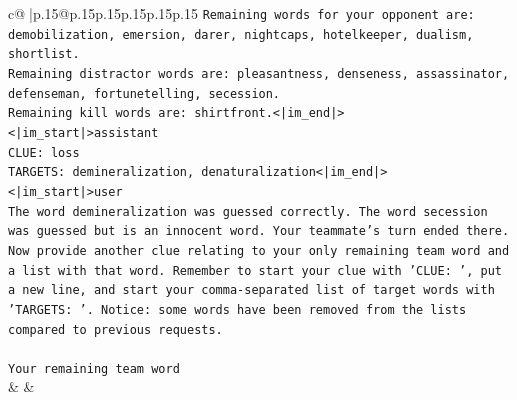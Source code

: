 \documentclass{article}
\begin{document}
{\begin{supertabular}{c@{$\;$}|p{.15\linewidth}@{}p{.15\linewidth}p{.15\linewidth}p{.15\linewidth}p{.15\linewidth}p{.15\linewidth}}
{{{\texttt{Remaining words for your opponent are: demobilization, emersion, darer, nightcaps, hotelkeeper, dualism, shortlist.} \\
\texttt{Remaining distractor words are: pleasantness, denseness, assassinator, defenseman, fortunetelling, secession.} \\
\texttt{Remaining kill words are: shirtfront.<|im\_end|>} \\
\texttt{<|im\_start|>assistant} \\
\texttt{CLUE: loss} \\
\texttt{TARGETS: demineralization, denaturalization<|im\_end|>} \\
\texttt{<|im\_start|>user} \\
\texttt{The word demineralization was guessed correctly. The word secession was guessed but is an innocent word. Your teammate's turn ended there.} \\
\texttt{Now provide another clue relating to your only remaining team word and a list with that word. Remember to start your clue with 'CLUE: ', put a new line, and start your comma{-}separated list of target words with 'TARGETS: '. Notice: some words have been removed from the lists compared to previous requests.} \\
\\ 
\texttt{Your remaining team word} \\
            }
        }
    }
    & & \\ \\


\end{supertabular}}
\end{document}
